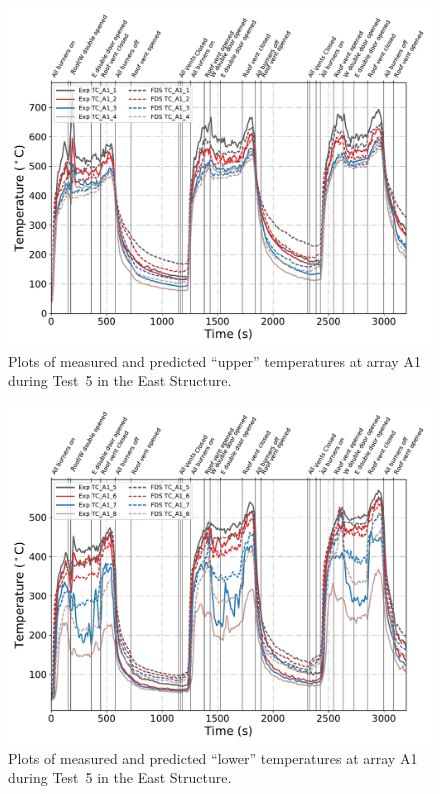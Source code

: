\clearpage
\begin{figure}[p]
	\centering
	\includegraphics[width=\columnwidth]{Figures/Plots/Validation/Temperature/Test_5_TC_A1_upper}
	\caption{Plots of measured and predicted ``upper'' temperatures at array A1 during Test~5 in the East Structure.}
	\label{fig:TCA1_upper_data_Test5}
\end{figure}
\begin{figure}[p]
	\centering
	\includegraphics[width=\columnwidth]{Figures/Plots/Validation/Temperature/Test_5_TC_A1_lower}
	\caption{Plots of measured and predicted ``lower'' temperatures at array A1 during Test~5 in the East Structure.}
	\label{fig:TCA1_lower_data_Test5}
\end{figure}

